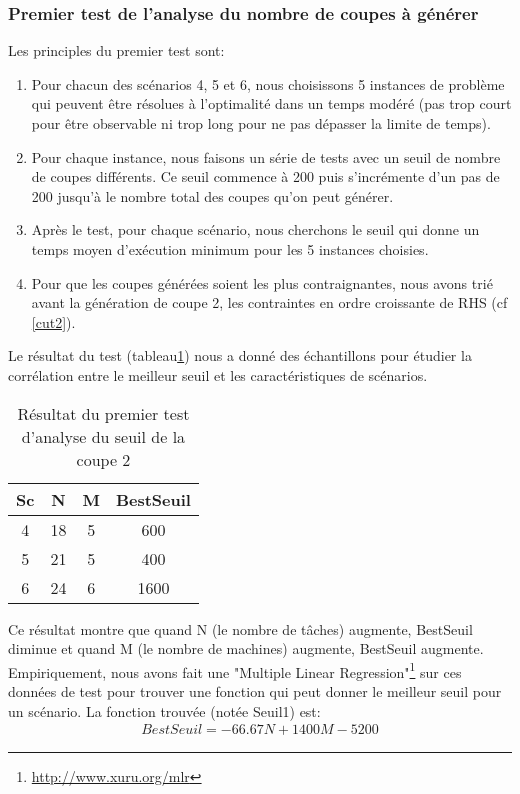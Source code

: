 \subsubsection{Premier test de l'analyse du nombre de coupes à générer}
Les principles du premier test sont:
\begin{enumerate}
	\item Pour chacun des scénarios 4, 5 et 6, nous choisissons 5 instances de problème qui peuvent être résolues à l'optimalité dans un temps modéré (pas trop court pour être observable ni trop long pour ne pas dépasser la limite de temps).
	\item Pour chaque instance, nous faisons un série de tests avec un seuil de nombre de coupes différents. Ce seuil commence à 200 puis s'incrémente d'un pas de 200 jusqu'à le nombre total des coupes qu'on peut générer.
	\item Après le test, pour chaque scénario, nous cherchons le seuil qui donne un temps moyen d'exécution minimum pour les 5 instances choisies.
	\item Pour que les coupes générées soient les plus contraignantes, nous avons trié avant la génération de coupe 2, les contraintes en ordre croissante de RHS (cf \ref{cut2}).
\end{enumerate}
	
Le résultat du test (tableau\ref{tab_pre_2_seuil}) nous a donné des échantillons pour étudier la corrélation entre le meilleur seuil et les caractéristiques de scénarios.

\begin{table}[h]
    \centering
    \begin{tabular}{|c|c|c|c|}
    	\hline
Sc& 	N	& M	& BestSeuil\\ \hline
4 & 	18	& 5	& 600      \\ \hline
5 & 	21	& 5	& 400      \\ \hline
6 & 	24	& 6	& 1600     \\ \hline
    \end{tabular}
    \caption{Résultat du premier test d'analyse du seuil de la coupe 2}
    \label{tab_pre_2_seuil}
\end{table}
\bigskip

Ce résultat montre que quand N (le nombre de tâches) augmente, BestSeuil diminue et quand M (le nombre de machines) augmente, BestSeuil augmente. Empiriquement, nous avons fait une "Multiple Linear Regression"\footnote{\url{http://www.xuru.org/mlr}} sur ces données de test pour trouver une fonction qui peut donner le meilleur seuil pour un scénario. La fonction trouvée (notée Seuil1) est:
\begin{align}
BestSeuil=-66.67N+1400M-5200
\end{align}

